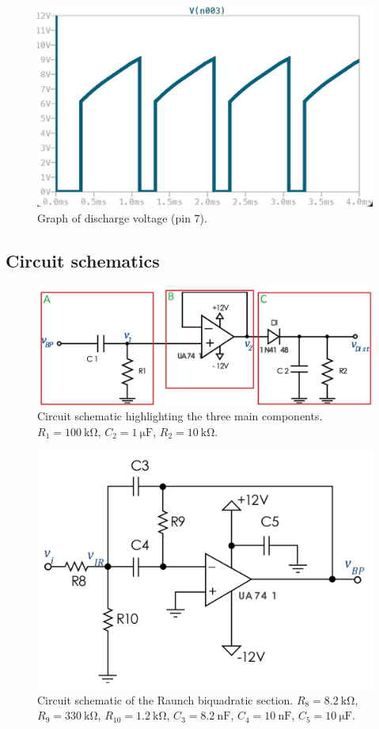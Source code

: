 \documentclass[lettersize,journal]{IEEEtran}
\begin{document}
\begin{figure}[H]
    \centering
    \includegraphics[width=\linewidth]{images/ltspice7.jpg}
    \caption{Graph of discharge voltage (pin 7).}
    \label{fig:ltspice_sim_settings_week2}
\end{figure}

\subsection{Circuit schematics}
\begin{figure}[H]
    \centering
    \includegraphics[width=0.9\linewidth]{images/week1_circuit_components.jpeg}
    \caption{Circuit schematic highlighting the three main components. $R_1 = \SI{100}{\kilo \ohm}$, $C_2 = \SI{1}{\micro \farad}$, $R_2 = \SI{10}{\kilo \ohm}$.}
    \label{fig:circuit_components}
\end{figure}

\begin{figure}[H]
    \centering
    \includegraphics[width=0.7\linewidth]{images/biquad_bandpass.png}
    \caption{Circuit schematic of the Raunch biquadratic section. $R_8 = \SI{8.2}{\kilo \ohm}$, $R_9 = \SI{330}{\kilo \ohm}$, $R_{10} = \SI{1.2}{\kilo \ohm}$, $C_3 = \SI{8.2}{\nano \farad}$, $C_4 = \SI{10}{\nano \farad}$, $C_5 = \SI{10}{\micro \farad}$.}
    \label{fig:biquad_filter}
\end{figure}
\end{document}
